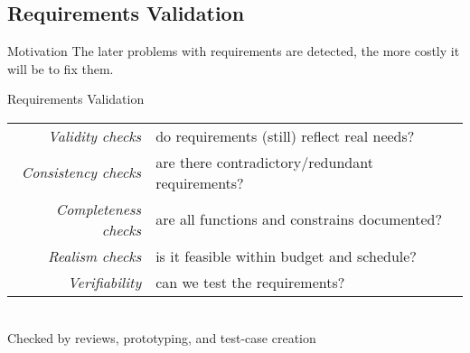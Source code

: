 \subsection{Requirements Validation}
\begin{frame}{\insertsubsection}
	\begin{fancycolumns}[animation=none,widths={75}]
		\begin{note}{Motivation}
			The later problems with requirements are detected, the more costly it will be to fix them.
		\end{note}
		\begin{definition}{Requirements Validation}
			\setlength\tabcolsep{1mm}
			\begin{tabularx}{\textwidth}{rX}
				\emph{Validity checks} & do requirements (still) reflect real needs?\\
				\emph{Consistency checks} & are there contradictory/redundant requirements?\\
				\emph{Completeness checks} & are all functions and constrains documented?\\
				\emph{Realism checks} & is it feasible within budget and schedule?\\
				\emph{Verifiability} & can we test the requirements?
			\end{tabularx}
			
			~\\Checked by reviews, prototyping, and test-case creation
		\end{definition}
	\end{fancycolumns}
\end{frame}

